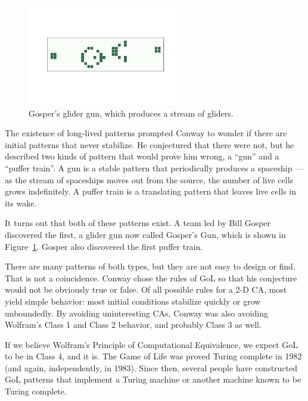 \documentclass[12pt]{book}
\theoremstyle{exercise}
\begin{document}


\begin{figure}
\centerline{\includegraphics[height=1.75in]{figs/chap06-5.pdf}}
\caption{Gosper's glider gun, which produces a stream of gliders.}
\label{chap06-5}
\end{figure}

The existence of long-lived patterns prompted Conway to wonder if
there are initial patterns that never stabilize.  He
conjectured that there were not, but he described two kinds of pattern
that would prove him wrong, a ``gun'' and a ``puffer train''.  A gun
is a stable pattern that periodically produces a spaceship --- as the
stream of spaceships moves out from the source, the number of live
cells grows indefinitely.  A puffer train is a translating pattern
that leaves live cells in its wake.


It turns out that both of these patterns exist.  A team led
by Bill Gosper discovered the first, a glider gun now called
Gosper's Gun, which is shown in Figure~\ref{chap06-5}.
Gosper also discovered the first puffer train.


There are many patterns of both types, but they are not easy to
design or find.  That is not a coincidence.  Conway chose the
rules of GoL so that his conjecture would not be obviously
true or false.  Of all possible rules for a 2-D CA, most
yield simple behavior: most initial conditions stabilize quickly
or grow unboundedly.  By avoiding uninteresting CAs, Conway
was also avoiding Wolfram's Class 1 and Class 2 behavior, and
probably Class 3 as well.

If we believe Wolfram's Principle of Computational Equivalence, we
expect GoL to be in Class 4, and it is.  The Game of Life was proved
Turing complete in 1982 (and again, independently, in 1983).
Since then, several people have constructed GoL patterns that implement
a Turing machine or another machine known to be Turing complete.
\end{document}
